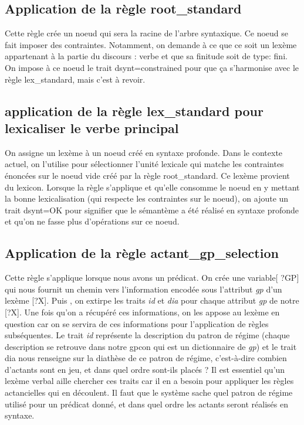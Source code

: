 \subsection{Application de la règle root{\_}standard}
Cette règle crée un noeud qui sera la racine de l'arbre syntaxique. Ce noeud se fait imposer des contraintes. Notamment, on demande à ce que ce soit un lexème appartenant à la partie du discours : verbe et que sa finitude soit de type: fini. On impose à ce noeud le trait dsynt=constrained pour que ça s'harmonise avec le règle lex{\_}standard, mais c'est à revoir.

\subsection{application de la règle lex{\_}standard pour lexicaliser le verbe principal}
On assigne un lexème à un noeud  créé en syntaxe profonde. Dans le contexte actuel, on l'utilise pour sélectionner l'unité lexicale qui matche les contraintes énoncées sur le noeud vide créé par la règle root{\_}standard. Ce lexème provient du lexicon. Lorsque la règle s'applique et qu'elle consomme le noeud en y mettant la bonne lexicalisation (qui respecte les contraintes sur le noeud), on ajoute un trait dsynt=OK pour signifier que le sémantème a été réalisé en syntaxe profonde et qu'on ne fasse plus d'opérations sur ce noeud.

\subsection{Application de la règle actant{\_}gp{\_}selection}
Cette règle s'applique lorsque nous avons un prédicat.
On crée une variable[ ?GP] qui nous fournit un chemin vers l'information encodée sous l'attribut \emph{ gp} d'un lexème [?X]. Puis , on extirpe les traits \emph{ id} et \emph{dia} pour chaque attribut\emph{ gp} de notre [?X]. Une fois qu'on a récupéré ces informations, on les appose au lexème en question car on se servira de ces informations pour l'application de règles subséquentes. Le trait \emph{ id} représente la description du patron de régime (chaque description se retrouve dans notre gpcon qui est un dictionnaire de\emph{ gp}) et le trait dia nous renseigne sur la diathèse de ce patron de régime, c'est-à-dire combien d'actants sont en jeu, et dans quel ordre sont-ils placés ? Il est essentiel qu'un lexème verbal aille chercher ces traits car il en a besoin pour appliquer les règles actancielles qui en découlent. Il faut que le système sache quel patron de régime utilisé pour un prédicat donné, et dans quel ordre les actants seront réalisés en syntaxe.

